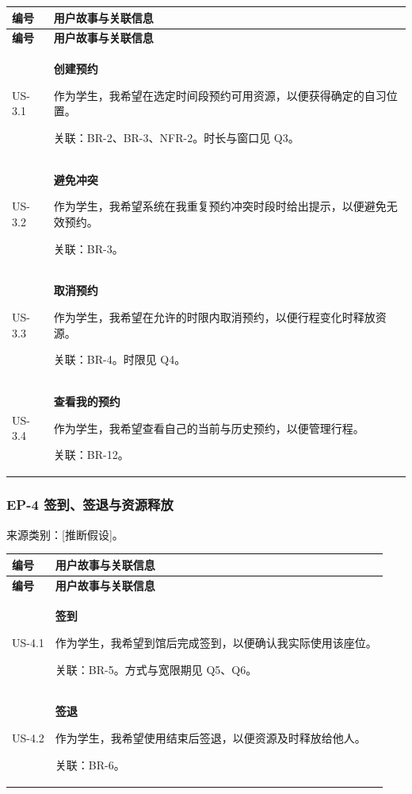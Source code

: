 \documentclass[11pt,a4paper]{article}
\begin{document}
\begin{longtable}{@{}p{}p{}@{}}
    \toprule
    \textbf{编号} & \textbf{用户故事与关联信息} \\
    \midrule
    \endfirsthead
    \toprule
    \textbf{编号} & \textbf{用户故事与关联信息} \\
    \midrule
    \endhead
    \bottomrule
    \endlastfoot
    US-3.1 & \textbf{创建预约}\par 作为学生，我希望在选定时间段预约可用资源，以便获得确定的自习位置。\par {\small 关联：BR-2、BR-3、NFR-2。时长与窗口见 Q3。} \\
    \midrule
    US-3.2 & \textbf{避免冲突}\par 作为学生，我希望系统在我重复预约冲突时段时给出提示，以便避免无效预约。\par {\small 关联：BR-3。} \\
    \midrule
    US-3.3 & \textbf{取消预约}\par 作为学生，我希望在允许的时限内取消预约，以便行程变化时释放资源。\par {\small 关联：BR-4。时限见 Q4。} \\
    \midrule
    US-3.4 & \textbf{查看我的预约}\par 作为学生，我希望查看自己的当前与历史预约，以便管理行程。\par {\small 关联：BR-12。} \\
\end{longtable}

\subsubsection{EP-4 签到、签退与资源释放}
来源类别：[推断假设]。

\begin{longtable}{@{}p{}p{}@{}}
    \toprule
    \textbf{编号} & \textbf{用户故事与关联信息} \\
    \midrule
    \endfirsthead
    \toprule
    \textbf{编号} & \textbf{用户故事与关联信息} \\
    \midrule
    \endhead
    \bottomrule
    \endlastfoot
    US-4.1 & \textbf{签到}\par 作为学生，我希望到馆后完成签到，以便确认我实际使用该座位。\par {\small 关联：BR-5。方式与宽限期见 Q5、Q6。} \\
    \midrule
    US-4.2 & \textbf{签退}\par 作为学生，我希望使用结束后签退，以便资源及时释放给他人。\par {\small 关联：BR-6。} \\
\end{longtable}
\end{document}
